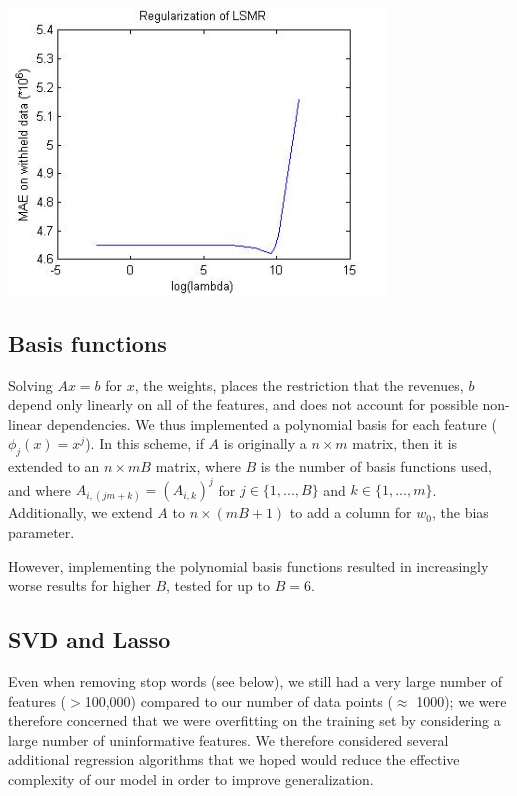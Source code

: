\documentclass[11pt]{amsart}
\begin{document}
\begin{center}
\includegraphics[width=10cm]{LSMR-Regularization.jpg}
\end{center}

\subsection{Basis functions}
Solving $Ax=b$ for $x$, the weights, places the restriction that the revenues, $b$ depend only linearly on all of the features, and does not account for possible non-linear dependencies. We thus implemented a polynomial basis for each feature ($\phi_j(x)=x^j$). In this scheme, if $A$ is originally a $n\times m$ matrix, then it is extended to an $n \times mB$ matrix, where $B$ is the number of basis functions used, and where $A_{i,(jm+k)}=(A_{i,k})^j$ for $j\in\{1,...,B\}$ and $k\in\{1,...,m\}$. Additionally, we extend $A$ to $n\times (mB+1)$ to add a column for $w_0$, the bias parameter.

However, implementing the polynomial basis functions resulted in increasingly worse results for higher $B$, tested for up to $B=6$.

\subsection{SVD and Lasso}

Even when removing stop words (see below), we still had a very large number of features ($>$100,000) compared to our number of data points ($\approx$ 1000); we were therefore concerned that we were overfitting on the training set by considering a large number of uninformative features.  We therefore considered several additional regression algorithms that we hoped would reduce the effective complexity of our model in order to improve generalization. 
\end{document}
